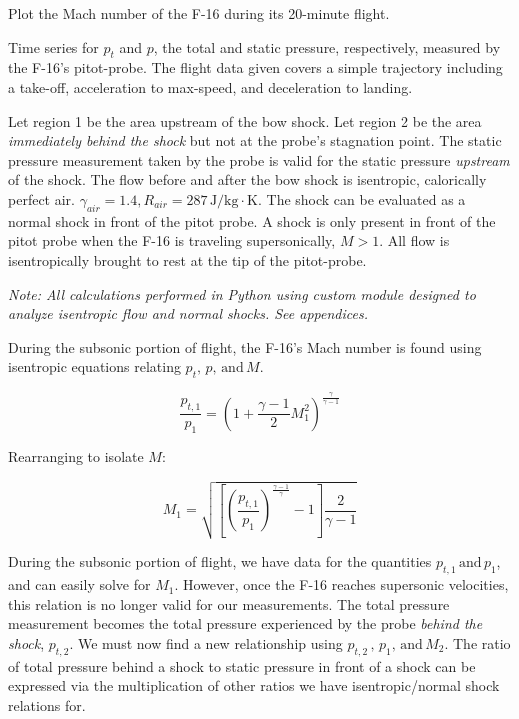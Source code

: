 \documentclass[../main.tex]{subfiles}
\begin{document}

 Plot the Mach number of the F-16 during its 20-minute flight.

\givens{}

Time series for \(p_t\) and \(p\), the total and static pressure, respectively, measured by the F-16's pitot-probe.
The flight data given covers a simple trajectory including a take-off, acceleration to max-speed, and deceleration to landing.

\assumptions{}

Let region 1 be the area upstream of the bow shock.
Let region 2 be the area \textit{immediately behind the shock} but not at the probe's stagnation point.
The static pressure measurement taken by the probe is valid for the static pressure \textit{upstream} of the shock.
The flow before and after the bow shock is isentropic, calorically perfect air. \(\gamma_{air} = 1.4, R_{air} = 287 \, \unit{\joule/\kilogram\cdot\kelvin}\).
The shock can be evaluated as a normal shock in front of the pitot probe.
A shock is only present in front of the pitot probe when the F-16 is traveling supersonically, \(M > 1\).
All flow is isentropically brought to rest at the tip of the pitot-probe.

\solution{}

\textit{Note: All calculations performed in Python using custom module designed to analyze isentropic flow and normal shocks. See appendices.}

During the subsonic portion of flight, the F-16's Mach number is found using isentropic equations relating \(p_t,\, p, \,\textrm{and} \, M\).

\[
    \frac{p_{t,1}}{p_1} = {\left({1 + \frac{\gamma-1}{2}M_1^2}\right)}^{\frac{\gamma}{\gamma-1}}
\]

Rearranging to isolate \(M\):

\[
    M_1 = \sqrt{
        \left[{{\left({\frac{p_{t,1}}{p_1}}\right)}^{\frac{\gamma-1}{\gamma}} - 1}\right]
        \frac{2}{\gamma-1}
    }
\]

During the subsonic portion of flight, we have data for the quantities \(p_{t,1} \, \textrm{and} \, p_1 \), and can easily solve for \(M_1\).
However, once the F-16 reaches supersonic velocities, this relation is no longer valid for our measurements. 
The total pressure measurement becomes the total pressure experienced by the probe \textit{behind the shock}, \(p_{t,2}\).
We must now find a new relationship using \(p_{t,2} \, , \, p_1 , \, \textrm{and} \, M_2\).
The ratio of total pressure behind a shock to static pressure in front of a shock can be expressed via the multiplication of other ratios we have isentropic/normal shock relations for.
\end{document}
